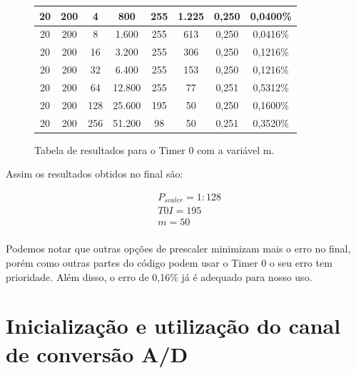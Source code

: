 \documentclass{article}
\begin{document}
\begin{figure}[H]
\begin{tabular}{|c|c|c|c|c|c|c|c|}
\rowcolor[HTML]{FFFFFF} 
20                & 200                       & 4                   & 800            & 255          & 1.225      & 0,250        & 0,0400\%      \\ \hline
\rowcolor[HTML]{FFFFFF} 
20                & 200                       & 8                   & 1.600          & 255          & 613        & 0,250        & 0,0416\%      \\ \hline
\rowcolor[HTML]{FFFFFF} 
20                & 200                       & 16                  & 3.200          & 255          & 306        & 0,250        & 0,1216\%      \\ \hline
\rowcolor[HTML]{FFFFFF} 
20                & 200                       & 32                  & 6.400          & 255          & 153        & 0,250        & 0,1216\%      \\ \hline
\rowcolor[HTML]{FFFFFF} 
20                & 200                       & 64                  & 12.800         & 255          & 77         & 0,251        & 0,5312\%      \\ \hline
\rowcolor[HTML]{FFFFFF} 
20                & 200                       & 128                 & 25.600         & 195          & 50         & 0,250        & 0,1600\%      \\ \hline
\rowcolor[HTML]{FFFFFF} 
20                & 200                       & 256                 & 51.200         & 98           & 50         & 0,251        & 0,3520\%      \\ \hline
\end{tabular}
\fi
\caption{Tabela de resultados para o Timer 0 com a variável m.}
\label{Tabel250ms}
\end{figure}

Assim os resultados obtidos no final são:

\begin{align*}
    & P_{scaler} = 1:128\\
    & T0I = 195 \\
    & m = 50\\
\end{align*}

Podemos notar que outras opções de prescaler minimizam mais o erro no final, porém como outras partes do código podem usar o Timer 0 o seu erro tem prioridade. Além disso, o erro de 0,16\% já é adequado para nosso uso.
\section{ Inicialização e utilização do canal de conversão A/D}
\end{document}
